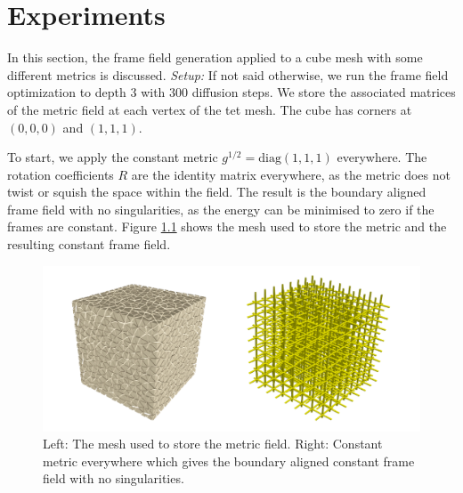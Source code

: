 \documentclass[../thesis.tex]{subfiles}
\begin{document}
\chapter{Experiments}
\label{ch:experiments}
In this section, the frame field generation applied to a cube mesh
with some different metrics is discussed.
\emph{Setup:}
If not said otherwise, we run the frame field optimization to depth $3$ with $300$ diffusion steps.
We store the associated matrices of the metric field at each vertex of the
tet mesh. The cube has corners at $(0,0,0)$ and $(1,1,1)$.

To start, we apply the constant metric  $g^{1/2}=\mathrm{diag}(1,1,1)$
everywhere. The rotation coefficients $R$ are the identity matrix everywhere, as the metric does not twist or squish the space within the field.
The result is the boundary aligned frame field with no singularities, as the energy can be minimised to zero if the frames are constant. Figure \ref{fig:image1} shows the mesh used to store the metric
and the resulting constant frame field.
\begin{figure}[htb]
    \centering
    \includegraphics[width=\textwidth]{figures/image1}
    \caption{Left: The mesh used to store the metric field. Right: Constant metric everywhere which gives the boundary aligned constant frame field with no singularities.}
    \label{fig:image1}
\end{figure}
\end{document}
